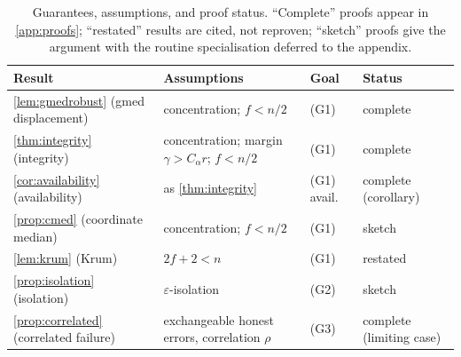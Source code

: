 \begin{table}[t]
\centering
\caption{Guarantees, assumptions, and proof status. ``Complete'' proofs appear in
\cref{app:proofs}; ``restated'' results are cited, not reproven; ``sketch'' proofs give the
argument with the routine specialisation deferred to the appendix.}
\label{tab:guarantees}
\small
\begin{tabular}{@{}p{3.2cm}p{4.4cm}p{2.2cm}p{2.4cm}@{}}
\toprule
Result & Assumptions & Goal & Status \\
\midrule
\cref{lem:gmedrobust} (gmed displacement) & concentration; $f<n/2$ & (G1) & complete \\
\cref{thm:integrity} (integrity) & concentration; margin $\gamma>C_\alpha r$; $f<n/2$ & (G1) & complete \\
\cref{cor:availability} (availability) & as \cref{thm:integrity} & (G1) avail. & complete (corollary) \\
\cref{prop:cmed} (coordinate median) & concentration; $f<n/2$ & (G1) & sketch \\
\cref{lem:krum} (Krum) & $2f{+}2<n$ & (G1) & restated~\cite{blanchard2017krum} \\
\cref{prop:isolation} (isolation) & $\varepsilon$-isolation & (G2) & sketch \\
\cref{prop:correlated} (correlated failure) & exchangeable honest errors, correlation $\rho$ & (G3) & complete (limiting case) \\
\bottomrule
\end{tabular}
\end{table}
